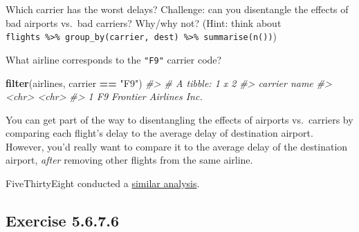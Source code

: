 \documentclass[]{book}
\newenvironment{Shaded}{\begin{snugshade}}{\end{snugshade}}
\newcommand{\CommentTok}[1]{\textcolor[rgb]{0.56,0.35,0.01}{\textit{#1}}}
\newcommand{\DataTypeTok}[1]{\textcolor[rgb]{0.13,0.29,0.53}{#1}}
\newcommand{\KeywordTok}[1]{\textcolor[rgb]{0.13,0.29,0.53}{\textbf{#1}}}
\newcommand{\NormalTok}[1]{#1}
\newcommand{\OperatorTok}[1]{\textcolor[rgb]{0.81,0.36,0.00}{\textbf{#1}}}
\newcommand{\OtherTok}[1]{\textcolor[rgb]{0.56,0.35,0.01}{#1}}
\newcommand{\StringTok}[1]{\textcolor[rgb]{0.31,0.60,0.02}{#1}}
\theoremstyle{plain}
\theoremstyle{remark}
\begin{document}
Which carrier has the worst delays? Challenge: can you disentangle the
effects of bad airports vs.~bad carriers? Why/why not? (Hint: think
about
\texttt{flights\ \%\textgreater{}\%\ group\_by(carrier,\ dest)\ \%\textgreater{}\%\ summarise(n())})

\begin{Shaded}
\end{Shaded}

What airline corresponds to the \texttt{"F9"} carrier code?

\begin{Shaded}
\begin{Highlighting}[]
\KeywordTok{filter}\NormalTok{(airlines, carrier }\OperatorTok{==}\StringTok{ "F9"}\NormalTok{)}
\CommentTok{#> # A tibble: 1 x 2}
\CommentTok{#>   carrier name                  }
\CommentTok{#>   <chr>   <chr>                 }
\CommentTok{#> 1 F9      Frontier Airlines Inc.}
\end{Highlighting}
\end{Shaded}

You can get part of the way to disentangling the effects of airports
vs.~carriers by comparing each flight's delay to the average delay of
destination airport. However, you'd really want to compare it to the
average delay of the destination airport, \emph{after} removing other
flights from the same airline.

FiveThirtyEight conducted a
\href{http://fivethirtyeight.com/features/the-best-and-worst-airlines-airports-and-flights-summer-2015-update/}{similar
analysis}.

\hypertarget{exercise-5.6.7.6}{%
\subsection*{\texorpdfstring{Exercise
{5.6.7.6}}{Exercise 5.6.7.6}}\label{exercise-5.6.7.6}}
\end{document}
